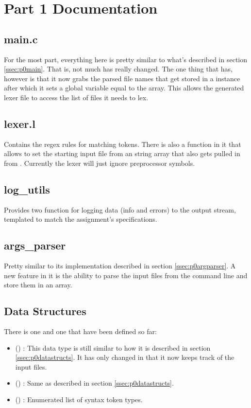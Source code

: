 \documentclass{article}
\begin{document}
\section{Part 1 Documentation}
\subsection{main.c} 
\label{ssec:p1main}
For the most part, everything here is pretty similar to what's described in section \ref{ssec:p0main}.
That is, not much has really changed.
The one thing that has, however is that it now grabs the parsed file names that get stored in a  instance after which it sets a global variable equal to the array.
This allows the generated lexer file to access the list of files it needs to lex.

\subsection{lexer.l} 
\label{ssec:p1lexer}
Contains the regex rules for matching tokens.
There is also a function in it that allows  to set the starting input file from an  string array that also gets pulled in from .
Currently the lexer will just ignore preprocessor symbols. 

\subsection{log\_utils} 
\label{ssec:p1logutils}
Provides two function for logging data (info and errors) to the output stream, templated to match the assignment's specifications.

\subsection{args\_parser} 
\label{ssec:p1argparser}
Pretty similar to its implementation described in section \ref{ssec:p0argparser}.
A new feature in it is the ability to parse the input files from the command line and store them in an array.

\subsection{Data Structures} 
\label{ssec:p1datastructs}
There is one  and one  that have been defined so far:
\begin{itemize}
    \item () : This data type is still similar to how it is described in section \ref{ssec:p0datastructs}.
        It has only changed in that it now keeps track of the input files.
    \item () : Same as described in section \ref{ssec:p0datastructs}.
    \item () : Enumerated list of syntax token types.
\end{itemize}
\end{document}
